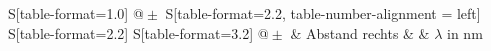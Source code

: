 \begin{table}
    \centering
    \caption{Berechnung der Wellenlänge $\lambda$ durch die Abstände der Interferenzmaxima}
    \label{tab:Wellenlaenge}
    \begin{tabular}{
	S[table-format=1.0]
	@{${}\pm{}$}
	S[table-format=2.2, table-number-alignment = left]
	S[table-format=2.2]
	S[table-format=3.2]
	@{${}\pm{}$}
	}
	\toprule
			& {Abstand rechts}		& 
			& {$\lambda$ in $\si{\nano\meter}$}		\\ 
	\midrule
    
    \bottomrule
    \end{tabular}
    \end{table}

